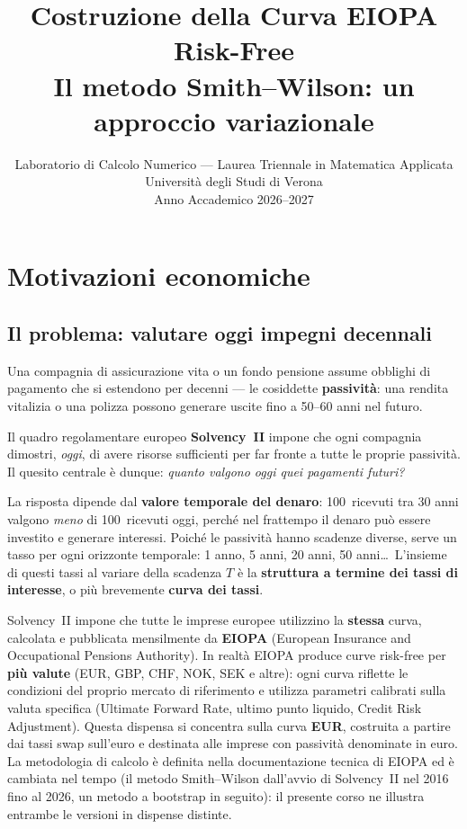 \documentclass[11pt,a4paper]{article}
\title{%
  \textbf{Costruzione della Curva EIOPA Risk-Free}\\[6pt]
  \large Il metodo Smith--Wilson: un approccio variazionale\\[4pt]
}
\author{Laboratorio di Calcolo Numerico --- Laurea Triennale in Matematica Applicata\\
  Universit\`a degli Studi di Verona\\[2pt]
  Anno Accademico 2026--2027}
\date{}
\theoremstyle{plain}
\theoremstyle{definition}
\theoremstyle{remark}
\begin{document}
\maketitle
\tableofcontents
\newpage

\section{Motivazioni economiche}

\subsection{Il problema: valutare oggi impegni decennali}

Una compagnia di assicurazione vita o un fondo pensione assume obblighi di pagamento che si
estendono per decenni --- le cosiddette \textbf{passività}: una rendita vitalizia o una
polizza possono generare uscite fino a 50--60 anni nel futuro.

Il quadro regolamentare europeo \textbf{Solvency~II} impone che ogni compagnia dimostri,
\emph{oggi}, di avere risorse sufficienti per far fronte a tutte le proprie passività. Il
quesito centrale \`e dunque: \emph{quanto valgono oggi quei pagamenti futuri?}

La risposta dipende dal \textbf{valore temporale del denaro}: 100\,\texteuro{} ricevuti tra
30 anni valgono \emph{meno} di 100\,\texteuro{} ricevuti oggi, perch\'e nel frattempo il
denaro pu\`o essere investito e generare interessi. Poich\'e le passivit\`a hanno scadenze
diverse, serve un tasso per ogni orizzonte temporale: 1 anno, 5 anni, 20 anni, 50 anni\ldots\
L'insieme di questi tassi al variare della scadenza $T$ \`e la \textbf{struttura a termine
dei tassi di interesse}, o pi\`u brevemente \textbf{curva dei tassi}.

Solvency~II impone che tutte le imprese europee utilizzino la \textbf{stessa} curva,
calcolata e pubblicata mensilmente da \textbf{EIOPA} (European Insurance and Occupational
Pensions Authority). In realt\`a EIOPA produce curve risk-free per \textbf{pi\`u valute}
(EUR, GBP, CHF, NOK, SEK e altre): ogni curva riflette le condizioni del proprio mercato
di riferimento e utilizza parametri calibrati sulla valuta specifica (Ultimate Forward Rate,
ultimo punto liquido, Credit Risk Adjustment). Questa dispensa si concentra sulla curva
\textbf{EUR}, costruita a partire dai tassi swap sull'euro e destinata alle imprese con
passivit\`a denominate in euro. La metodologia di calcolo \`e definita nella documentazione
tecnica di EIOPA ed \`e cambiata nel tempo (il metodo Smith--Wilson dall'avvio di Solvency~II
nel 2016 fino al 2026, un metodo a bootstrap in seguito): il presente corso ne illustra
entrambe le versioni in dispense distinte.
\end{document}
